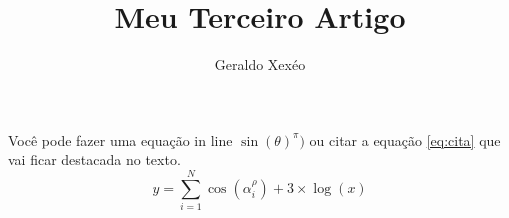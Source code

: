 \documentclass{article}
\title{Meu Terceiro Artigo}
\author{Geraldo Xexéo}
\begin{document}
\maketitle
Você pode fazer uma equação in line $\sin(\theta)^\pi)$ ou citar
a equação \ref{eq:cita} que vai ficar destacada no texto.
\begin{equation}\label{eq:cita}
  y = \sum^{N}_{i=1} \cos(\alpha_i^\rho)+3\times \log(x)
\end{equation}
\end{document}
